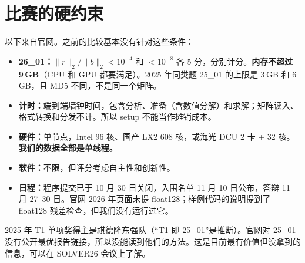\documentclass[11pt,a4paper]{ctexart}
\begin{document}
\section{比赛的硬约束}
以下来自官网\cite{sc26}。之前的比较基本没有针对这些条件：
\begin{itemize}
\item \textbf{26\_01：}$\|r\|_2/\|b\|_2<10^{-4}$ 和 $<10^{-8}$ 各 5 分，分别计分。\textbf{内存不超过 9\,GB}（CPU 和 GPU 都要满足）。2025 年同类题 25\_01 的上限是 3\,GB 和 6\,GB，且 MD5 不同，不是同一个矩阵。
\item \textbf{计时：}端到端墙钟时间，包含分析、准备（含数值分解）和求解；矩阵读入、格式转换和分发不计。所以 setup 不能当作摊销成本。
\item \textbf{硬件：}单节点，Intel 96 核、国产 LX2 608 核，或海光 DCU 2 卡 + 32 核。\textbf{我们的数据全部是单线程。}
\item \textbf{软件：}不限，但评分考虑自主性和创新性。
\item \textbf{日程：}程序提交已于 10 月 30 日关闭，入围名单 11 月 10 日公布，答辩 11 月 27--30 日。官网 2026 年页面未提 float128；样例代码的说明提到了 float128 残差检查\cite{sample}，但我们没有运行过它。
\end{itemize}
2025 年 T1 单项奖得主是祺德隆东强队\cite{awards}（“T1 即 25\_01”是推断）。官网对 25\_01 没有公开最优报告链接，所以没能读到他们的方法。这是目前最有价值但没拿到的信息，可以在 SOLVER26 会议上了解。
\end{document}

